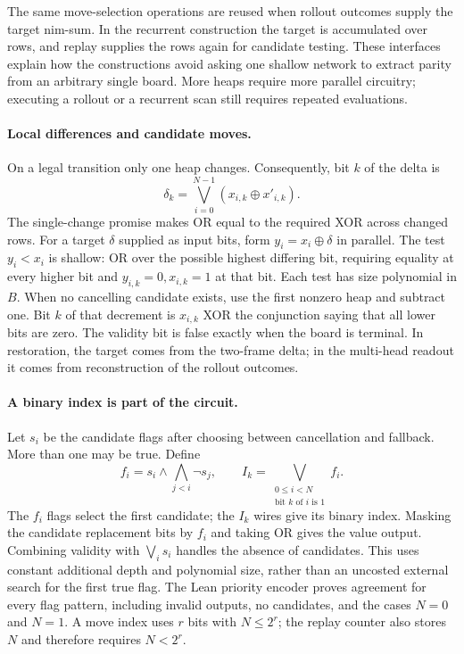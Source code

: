 \documentclass[11pt]{article}
\theoremstyle{plain}
\theoremstyle{definition}
\theoremstyle{remark}
\numberwithin{equation}{section}
\begin{document}
The same move-selection operations are reused when rollout outcomes supply the target nim-sum. In the recurrent construction the target is accumulated over rows, and replay supplies the rows again for candidate testing. These interfaces explain how the constructions avoid asking one shallow network to extract parity from an arbitrary single board. More heaps require more parallel circuitry; executing a rollout or a recurrent scan still requires repeated evaluations.

\paragraph{Local differences and candidate moves.}
On a legal transition only one heap changes. Consequently, bit $k$ of the delta is
\[
\delta_k=\bigvee_{i=0}^{N-1}(x_{i,k}\oplus x'_{i,k}).
\]
The single-change promise makes OR equal to the required XOR across changed rows. For a target $\delta$ supplied as input bits, form $y_i=x_i\oplus\delta$ in parallel. The test $y_i<x_i$ is shallow: OR over the possible highest differing bit, requiring equality at every higher bit and $y_{i,k}=0,x_{i,k}=1$ at that bit. Each test has size polynomial in $B$. When no cancelling candidate exists, use the first nonzero heap and subtract one. Bit $k$ of that decrement is $x_{i,k}$ XOR the conjunction saying that all lower bits are zero. The validity bit is false exactly when the board is terminal. In restoration, the target comes from the two-frame delta; in the multi-head readout it comes from reconstruction of the rollout outcomes.

\paragraph{A binary index is part of the circuit.}
Let $s_i$ be the candidate flags after choosing between cancellation and fallback. More than one may be true. Define
\[
f_i=s_i\wedge\bigwedge_{j<i}\neg s_j,
\qquad
I_k=\bigvee_{\substack{0\le i<N\\\text{bit }k\text{ of }i\text{ is }1}}f_i.
\]
The $f_i$ flags select the first candidate; the $I_k$ wires give its binary index. Masking the candidate replacement bits by $f_i$ and taking OR gives the value output. Combining validity with $\bigvee_i s_i$ handles the absence of candidates. This uses constant additional depth and polynomial size, rather than an uncosted external search for the first true flag. The Lean priority encoder proves agreement for every flag pattern, including invalid outputs, no candidates, and the cases $N=0$ and $N=1$. A move index uses $r$ bits with $N\le2^r$; the replay counter also stores $N$ and therefore requires $N<2^r$.
\end{document}

